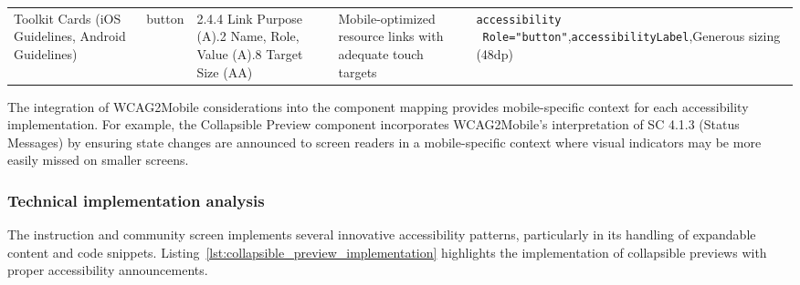\begin{longtable}[c]{|C{2.5cm}|C{1.8cm}|C{2.8cm}|C{3.5cm}|C{4.2cm}|}
\hline
Toolkit Cards (iOS Guidelines, Android Guidelines) & button & 2.4.4 Link Purpose (A).2 Name, Role, Value (A).8 Target Size (AA) & Mobile-optimized resource links with adequate touch targets & \texttt{accessibility \ Role="button"},\newline \texttt{accessibilityLabel},\newline Generous sizing (48dp) \\
\end{longtable}
\FloatBarrier

The integration of WCAG2Mobile considerations into the component mapping provides mobile-specific context for each accessibility implementation. For example, the Collapsible Preview component incorporates WCAG2Mobile's interpretation of SC 4.1.3 (Status Messages) by ensuring state changes are announced to screen readers in a mobile-specific context where visual indicators may be more easily missed on smaller screens.

\subsubsection{Technical implementation analysis}
\label{subsubsec:instruction-implementation-analysis}

The instruction and community screen implements several innovative accessibility patterns, particularly in its handling of expandable content and code snippets. Listing~\ref{lst:collapsible_preview_implementation} highlights the implementation of collapsible previews with proper accessibility announcements.

